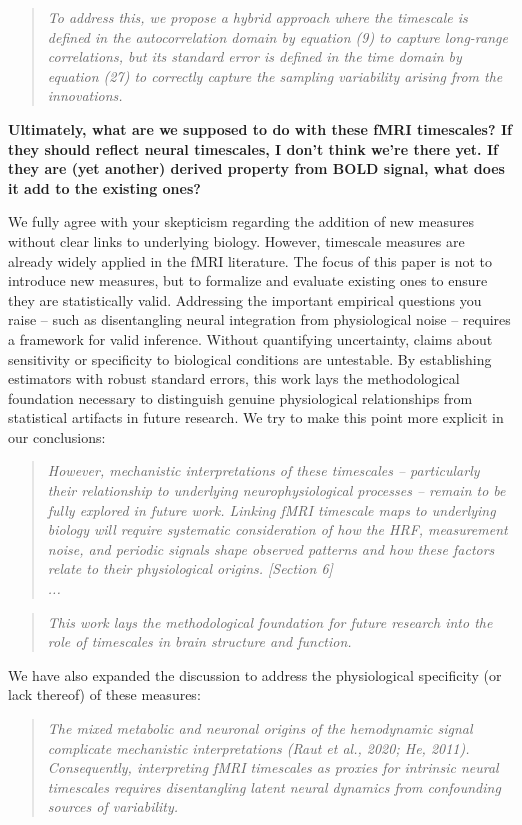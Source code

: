 \documentclass[docs/main.tex]{subfiles}
\newcommand{\reviewercomment}[1]{\vspace{0.3cm}\noindent\textbf{#1}\vspace{0.15cm}}
\newcommand{\manuscriptquote}[1]{\begin{quote}\textit{#1}\end{quote}}
\begin{document}
\manuscriptquote{To address this, we propose a hybrid approach where the timescale is defined in the autocorrelation domain by equation (9) to capture long-range correlations, but its standard error is defined in the time domain by equation (27) to correctly capture the sampling variability arising from the innovations.}

\reviewercomment{Ultimately, what are we supposed to do with these fMRI timescales? If they should reflect neural timescales, I don't think we're there yet. If they are (yet another) derived property from BOLD signal, what does it add to the existing ones?}

We fully agree with your skepticism regarding the addition of new measures without clear links to underlying biology. However, timescale measures are already widely applied in the fMRI literature. The focus of this paper is not to introduce new measures, but to formalize and evaluate existing ones to ensure they are statistically valid. Addressing the important empirical questions you raise -- such as disentangling neural integration from physiological noise -- requires a framework for valid inference. Without quantifying uncertainty, claims about sensitivity or specificity to biological conditions are untestable. By establishing estimators with robust standard errors, this work lays the methodological foundation necessary to distinguish genuine physiological relationships from statistical artifacts in future research. We try to make this point more explicit in our conclusions:

\manuscriptquote{However, mechanistic interpretations of these timescales -- particularly their relationship to underlying neurophysiological processes -- remain to be fully explored in future work. Linking fMRI timescale maps to underlying biology will require systematic consideration of how the HRF, measurement noise, and periodic signals shape observed patterns and how these factors relate to their physiological origins. [Section 6]\\...}
\manuscriptquote{This work lays the methodological foundation for future research
into the role of timescales in brain structure and function.}

We have also expanded the discussion to address the physiological specificity (or lack thereof) of these measures:
\manuscriptquote{The mixed metabolic and neuronal origins of the hemodynamic signal complicate mechanistic interpretations (Raut et al., 2020; He, 2011). Consequently, interpreting fMRI timescales as proxies for \textit{intrinsic neural timescales} requires disentangling latent neural dynamics from confounding sources of variability.}
\end{document}
